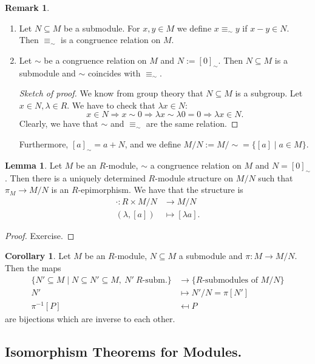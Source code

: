 \documentclass[12pt,a4paper]{report}
\theoremstyle{definition}
\newtheorem{corollary}[theorem]{Corollary} %
\newtheorem{lemma}[theorem]{Lemma}
\newtheorem*{remark}{Remark}
\theoremstyle{num.custom-title}
\DeclareMathOperator{\imp}{\Rightarrow}
\DeclareMathOperator{\sse}{\subseteq}
\begin{document}
\begin{remark}\ 
\begin{enumerate}
\item Let $N \sse M$ be a submodule. For $x,y \in M$ we define $x \equiv_\sim y$ if $x-y \in N$. Then $\equiv_\sim$ is a congruence relation on $M$.
\item Let $\sim$ be a congruence relation on $M$ and $N:=[0]_\sim$. Then $N \sse M$ is a submodule and $\sim$ coincides with $\equiv_\sim$.
\begin{proof}[Sketch of proof]
We know from group theory that $N \sse M$ is a subgroup. Let $x \in N, \lambda \in R$. We have to check that $\lambda x \in N$:
\[
x \in N \imp x \sim 0 \imp \lambda x \sim \lambda 0 = 0 \imp \lambda x \in N.
\]
Clearly, we have that $\sim$ and $\equiv_\sim$ are the same relation.
\end{proof}
Furthermore, $[a]_\sim = a+N$, and we define $M/N := M/{\sim} = \{[a] \mid a \in M\}$.
\end{enumerate}
\end{remark}

\begin{lemma}\label{quotient_mod_str}
Let $M$ be an $R$-module, $\sim$ a congruence relation on $M$ and $N=[0]_\sim$. Then there is a uniquely determined $R$-module structure on $M/N$ such that $\pi_ M \to M/N$ is an $R$-epimorphism. We have that the structure is
\begin{align*}
\cdot \colon R \times M/N &\to M/N \\
(\lambda,[a]) &\mapsto [\lambda a].
\end{align*}
\begin{proof}
Exercise.
\end{proof}
\end{lemma}

\begin{corollary}\label{submod_of_fac_mod}
Let $M$ be an $R$-module, $N \sse M$ a submodule and $\pi : M \to M/N$. Then the maps
\begin{align*}
\{N' \sse M \mid N \sse N' \sse M, \ N' \ R\text{-subm.}\} &\to \{R\text{-submodules of } M/N\} \\
N' & \mapsto N'/N = \pi[N'] \\
\pi^{-1}[P] &\mapsfrom P
\end{align*}
are bijections which are inverse to each other.
\end{corollary}

\subsection{Isomorphism Theorems for Modules.}
\end{document}
